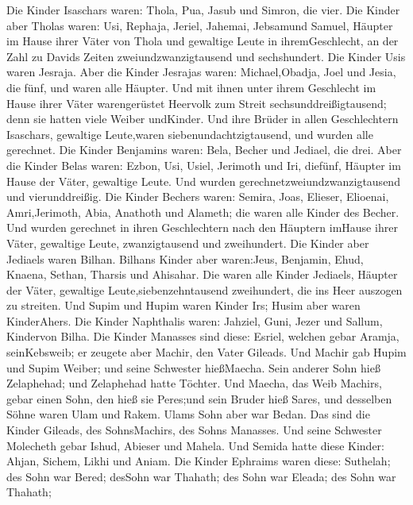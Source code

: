  Die Kinder Isaschars waren: Thola, Pua, Jasub und Simron,
die vier.  Die Kinder aber Tholas waren: Usi, Rephaja,
Jeriel, Jahemai, Jebsamund Samuel, Häupter im Hause ihrer Väter von
Thola und gewaltige Leute in ihremGeschlecht, an der Zahl zu Davids
Zeiten zweiundzwanzigtausend und sechshundert.  Die Kinder
Usis waren Jesraja. Aber die Kinder Jesrajas waren: Michael,Obadja, Joel
und Jesia, die fünf, und waren alle Häupter.  Und mit ihnen
unter ihrem Geschlecht im Hause ihrer Väter warengerüstet Heervolk zum
Streit sechsunddreißigtausend; denn sie hatten viele Weiber undKinder.
 Und ihre Brüder in allen Geschlechtern Isaschars, gewaltige
Leute,waren siebenundachtzigtausend, und wurden alle gerechnet.
 Die Kinder Benjamins waren: Bela, Becher und Jediael, die
drei.  Aber die Kinder Belas waren: Ezbon, Usi, Usiel,
Jerimoth und Iri, diefünf, Häupter im Hause der Väter, gewaltige Leute.
Und wurden gerechnetzweiundzwanzigtausend und vierunddreißig.
 Die Kinder Bechers waren: Semira, Joas, Elieser, Elioenai,
Amri,Jerimoth, Abia, Anathoth und Alameth; die waren alle Kinder des
Becher.  Und wurden gerechnet in ihren Geschlechtern nach
den Häuptern imHause ihrer Väter, gewaltige Leute, zwanzigtausend und
zweihundert.  Die Kinder aber Jediaels waren Bilhan.
Bilhans Kinder aber waren:Jeus, Benjamin, Ehud, Knaena, Sethan, Tharsis
und Ahisahar.  Die waren alle Kinder Jediaels, Häupter der
Väter, gewaltige Leute,siebenzehntausend zweihundert, die ins Heer
auszogen zu streiten.  Und Supim und Hupim waren Kinder
Irs; Husim aber waren KinderAhers.  Die Kinder Naphthalis
waren: Jahziel, Guni, Jezer und Sallum, Kindervon Bilha. 
Die Kinder Manasses sind diese: Esriel, welchen gebar Aramja,
seinKebsweib; er zeugete aber Machir, den Vater Gileads. 
Und Machir gab Hupim und Supim Weiber; und seine Schwester hießMaecha.
Sein anderer Sohn hieß Zelaphehad; und Zelaphehad hatte Töchter.
 Und Maecha, das Weib Machirs, gebar einen Sohn, den hieß
sie Peres;und sein Bruder hieß Sares, und desselben Söhne waren Ulam und
Rakem.  Ulams Sohn aber war Bedan. Das sind die Kinder
Gileads, des SohnsMachirs, des Sohns Manasses.  Und seine
Schwester Molecheth gebar Ishud, Abieser und Mahela.  Und
Semida hatte diese Kinder: Ahjan, Sichem, Likhi und Aniam. 
Die Kinder Ephraims waren diese: Suthelah; des Sohn war Bered; desSohn
war Thahath; des Sohn war Eleada; des Sohn war Thahath; 
